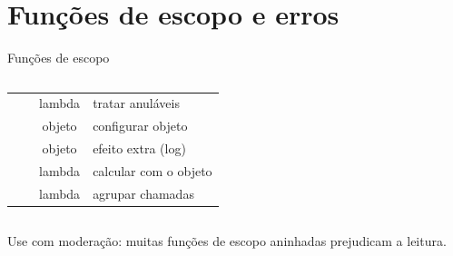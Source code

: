 \documentclass[aspectratio=169,10pt]{beamer}
\begin{document}
\section{Funções de escopo e erros}

\begin{frame}[fragile]{Funções de escopo}
  \begin{columns}[T]
    \begin{column}{0.5\textwidth}
      \footnotesize
      \begin{tabularx}{\linewidth}{@{}l c c L@{}}
        \toprule
         &  &  &  \\
        \midrule
         &  & lambda & tratar anuláveis \\
         &  & objeto & configurar objeto \\
         &  & objeto & efeito extra (log) \\
         &  & lambda & calcular com o objeto \\
         &  & lambda & agrupar chamadas \\
        \bottomrule
      \end{tabularx}
    \end{column}
    \begin{column}{0.48\textwidth}
    \end{column}
  \end{columns}
  \begin{dica}
    Use com moderação: muitas funções de escopo aninhadas prejudicam a leitura.
  \end{dica}
\end{frame}
\end{document}
